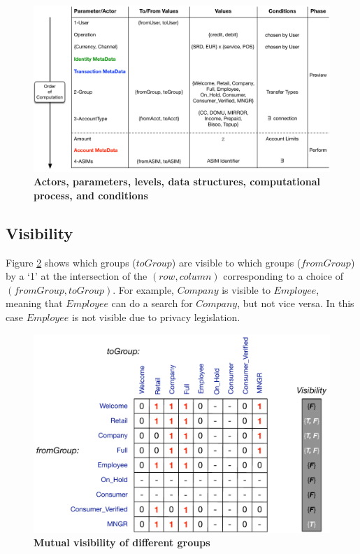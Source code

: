 \begin{figure}[htbp]
\centering
\includegraphics[width=17cm]{Figures/Vocabulary}
\caption{\small\textbf{Actors, parameters, levels, data structures, computational process, and conditions}}
\label{fig:vocabulary}
\end{figure}

\subsection{Visibility}
Figure \ref{fig:visibility} shows which groups ($toGroup$) are visible to which groups ($fromGroup$) by a `1' at the intersection of the $(row, column)$ corresponding to a choice of $(fromGroup, toGroup)$. For example, $Company$ is visible to $Employee$, meaning that $Employee$ can do a search for $Company$, but not vice versa. In this case $Employee$ is not visible due to privacy legislation.

\begin{figure}[H]
\centering
\includegraphics[width=12cm]{Figures/Visibility}
\caption{\small\textbf{Mutual visibility of different groups}}
\label{fig:visibility}
\vspace{-0.5cm}
\end{figure}

